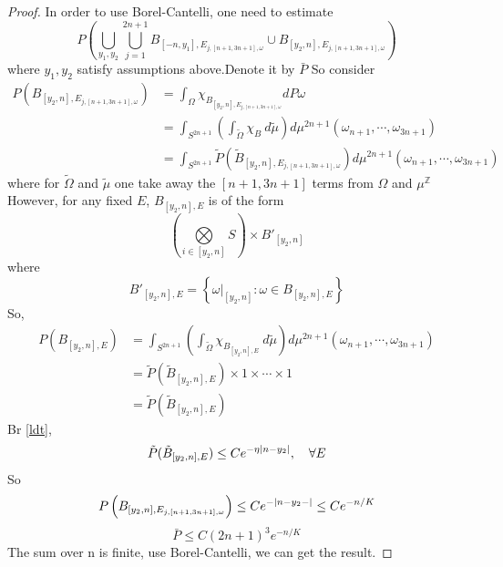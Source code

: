 \begin{proof}
In order to use Borel-Cantelli, one need to estimate
\[
  P\left(\bigcup\limits_{y_1,y_2}\bigcup\limits_{j=1}^{2n+1}
  B_{[-n,y_1],E_{j,[n+1,3n+1],\omega}}\cup B_{[y_2,n],E_{j,[n+1,3n+1],\omega}}\right)
\]
where $y_1,y_2$ satisfy assumptions above.Denote it by $\bar{P}$ So consider
\[
  \begin{aligned}
    P\left(B_{[y_2,n],E_{j,[n+1,3n+1],\omega}}\right)
    &= \int_\Omega \chi_{B_{[y_2,n],E_{j,[n+1,3n+1],\omega}}} dP\omega\\
    &= \int_{S^{2n+1}}\left(\int_{\tilde{\Omega}} \chi_{B}~ d\tilde{\mu}\right)d\mu^{2n+1}(\omega_{n+1},\cdots,\omega_{3n+1})\\
    &=\int_{S^{2n+1}} \tilde{P}(\tilde{B}_{[y_2,n],E_{j,[n+1,3n+1],\omega}})d\mu^{2n+1}(\omega_{n+1},\cdots,\omega_{3n+1})
  \end{aligned}
\]
where for $\tilde{\Omega}$ and $\tilde{\mu}$ one take away the $[n+1,3n+1]$ terms from $\Omega$ and $\mu^{\mathbb{Z}}$
However, for any fixed $E$, $B_{[y_2,n],E}$ is of the form
\[
  \left(\bigotimes\limits_{i\in[y_2,n]}S\right) \times {B'_{[y_2,n]}}
\]
where
\[
  B'_{[y_2,n],E}=\left\{\omega|_{[y_2,n]}:\omega\in B_{[y_2,n],E}\right\}
\]
So,
\[
  \begin{aligned}
    P(B_{[y_2,n],E})
    &= \int_{S^{2n+1}}\left(\int_{\tilde{\Omega}} \chi_{B_{[y_2,n],E}}~ d\tilde{\mu}\right)d\mu^{2n+1}(\omega_{n+1},\cdots,\omega_{3n+1})\\
    &=\tilde{P}(\tilde{B}_{[y_2,n],E})\times 1\times\cdots\times 1\\
    &=\tilde{P}(\tilde{B}_{[y_2,n],E})
  \end{aligned}
\]
Br \eqref{ldt},
\[
\tilde{P}(\tilde{B}_{[y_2,n],E})\leq Ce^{-\eta\lvert n-y_2\rvert},\quad \forall E
\]
So
\[
P\left(B_{[y_2,n],E_{j,[n+1,3n+1],\omega}}\right)\leq Ce^{-\lvert n-y_2-\rvert}\leq Ce^{-n/K}
\]
\[
\bar{P}\leq C(2n+1)^3e^{-n/K}
\]
The sum over n is finite, use Borel-Cantelli, we can get the result.
\end{proof}
